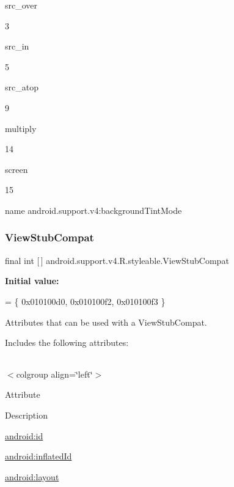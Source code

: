 {\ttfamily src\+\_\+over}

3

{\ttfamily src\+\_\+in}

5

{\ttfamily src\+\_\+atop}

9

{\ttfamily multiply}

14

{\ttfamily screen}

15

name android.\+support.\+v4\+:background\+Tint\+Mode \mbox{\label{classandroid_1_1support_1_1v4_1_1R_1_1styleable_a1cd2d3a360da85e50068df345a364a59}} 
\subsubsection{\texorpdfstring{View\+Stub\+Compat}{ViewStubCompat}}
{\footnotesize\ttfamily final int \mbox{[}$\,$\mbox{]} android.\+support.\+v4.\+R.\+styleable.\+View\+Stub\+Compat\hspace{0.3cm}{\ttfamily [static]}}

{\bfseries Initial value\+:}
\begin{DoxyCode}
= \{
            0x010100d0, 0x010100f2, 0x010100f3
        \}
\end{DoxyCode}
Attributes that can be used with a View\+Stub\+Compat. 

Includes the following attributes\+:

\tabulinesep=1mm
\begin{longtabu} spread 0pt [c]{*{0}{|X[-1]}|}
\hline
\end{longtabu}
$<$colgroup align=\char`\"{}left\char`\"{}$>$ 

Attribute

Description 

{\ttfamily \hyperlink{classandroid_1_1support_1_1v4_1_1R_1_1styleable_ada9d7e1b152db1b18492689abaa58a30}{android\+:id}}

{\ttfamily \hyperlink{classandroid_1_1support_1_1v4_1_1R_1_1styleable_a99ce544fb3cb0bda464169d5f26b9806}{android\+:inflated\+Id}}

{\ttfamily \hyperlink{classandroid_1_1support_1_1v4_1_1R_1_1styleable_af1b362398fc2f79e6599ea6bf0d712cc}{android\+:layout}}

